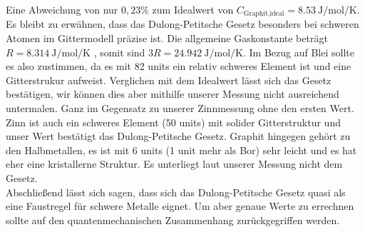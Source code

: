 Eine Abweichung von nur $0,23\%$ zum Idealwert von $C_{\text{Graphit,ideal}}=\SI{8,53}{\joule\per\mol\per\kelvin}$.\cite{wiki}\\
Es bleibt zu erwähnen, dass das Dulong-Petitsche Gesetz besonders bei schweren Atomen im Gittermodell präzise ist.
Die allgemeine Gaskonstante beträgt $R = \SI{8,314}{\joule\per\mol\per\kelvin}$ \cite{codata}, somit sind $3R = \SI{24,942}{\joule\per\mol\per\kelvin}$.
Im Bezug auf Blei sollte es also zustimmen, da es mit 82 units ein relativ schweres Element ist und eine Gitterstrukur aufweist.
Verglichen mit dem Idealwert lässt sich das Gesetz bestätigen, wir können dies aber mithilfe unserer Messung nicht ausreichend untermalen.
Ganz im Gegensatz zu unserer Zinnmessung ohne den ersten Wert.
Zinn ist auch ein schweres Element (50 units) mit solider Gitterstruktur und unser Wert bestätigt das Dulong-Petitsche Gesetz.
Graphit hingegen gehört zu den Halbmetallen, es ist mit 6 units (1 unit mehr als Bor) sehr leicht und es hat eher eine kristallerne Struktur.
Es unterliegt laut unserer Messung nicht dem Gesetz.\\
Abschließend lässt sich sagen, dass sich das Dulong-Petitsche Gesetz quasi als eine Faustregel für schwere Metalle eignet.
Um aber genaue Werte zu errechnen sollte auf den quantenmechanischen Zusammenhang zurückgegriffen werden.
